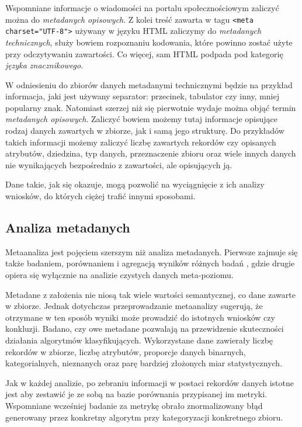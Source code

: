 	Wspomniane informacje o wiadomości na portalu społecznościowym zaliczyć można do \emph{metadanych opisowych}.
	Z kolei treść zawarta w tagu \lstinline{<meta charset="UTF-8">} używany w języku HTML zaliczymy do \emph{metadanych technicznych}, służy bowiem rozpoznaniu kodowania, które powinno zostać użyte przy odczytywaniu zawartości.
	Co więcej, sam HTML podpada pod kategorię \emph{języka znacznikowego}.

	W odniesieniu do zbiorów danych metadanymi technicznymi będzie na przykład informacja, jaki jest używany separator: przecinek, tabulator czy inny, mniej popularny znak.
	Natomiast szerzej niż się pierwotnie wydaje można objąć termin \emph{metadanych opisowych}.
	Zaliczyć bowiem możemy tutaj informacje opisujące rodzaj danych zawartych w zbiorze, jak i samą jego strukturę.
	Do przykładów takich informacji możemy zaliczyć liczbę zawartych rekordów czy opisanych atrybutów, dziedzina, typ danych, przeznaczenie zbioru oraz wiele innych danych nie wynikających bezpośrednio z zawartości, ale opisujących ją.

	Dane takie, jak się okazuje, mogą pozwolić na wyciągnięcie z ich analizy wniosków, do których ciężej trafić innymi sposobami.

	\subsection{Analiza metadanych}

	Metaanaliza jest pojęciem szerszym niż analiza metadanych.
	Pierwsze zajmuje się także badaniem, porównaniem i agregacją wyników różnych badań \cite{rosenthal2002meta}, gdzie drugie opiera się wyłącznie na analizie czystych danych meta-poziomu.

	Metadane z założenia nie niosą tak wiele wartości semantycznej, co dane zawarte w zbiorze.
	Jednak dotychczas przeprowadzanie metaanalizy sugerują, że otrzymane w ten sposób wyniki może prowadzić do istotnych wniosków czy konkluzji.
	Badano, czy owe metadane pozwalają na przewidzenie skuteczności działania algorytmów klasyfikujących.
	Wykorzystane dane zawierały liczbę rekordów w zbiorze, liczbę atrybutów, proporcje danych binarnych, kategorialnych, nieznanych oraz parę bardziej złożonych miar statystycznych.

	Jak w każdej analizie, po zebraniu informacji w postaci rekordów danych istotne jest aby zestawić je ze sobą na bazie porównania przypisanej im metryki.
	Wspomniane wcześniej badanie za metrykę obrało znormalizowany błąd generowany przez konkretny algorytm przy kategoryzacji konkretnego zbioru.
